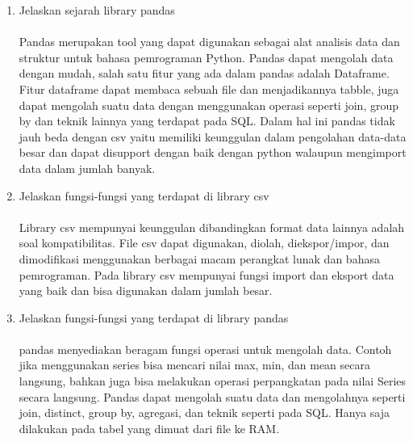 \begin{enumerate}
\item Jelaskan sejarah library pandas
\paragraph{} Pandas merupakan tool yang dapat digunakan sebagai alat analisis data dan struktur untuk bahasa pemrograman Python. Pandas dapat mengolah data dengan mudah, salah satu fitur yang ada dalam pandas adalah Dataframe. Fitur dataframe dapat membaca sebuah file dan menjadikannya tabble, juga dapat mengolah suatu data dengan menggunakan operasi seperti join, group by dan teknik lainnya yang terdapat pada SQL. Dalam hal ini pandas tidak jauh beda dengan csv yaitu memiliki keunggulan dalam pengolahan data-data besar dan dapat disupport dengan baik dengan python walaupun mengimport data dalam jumlah banyak.

\item Jelaskan fungsi-fungsi yang terdapat di library csv
\paragraph{} Library csv mempunyai keunggulan dibandingkan format data lainnya adalah soal kompatibilitas. File csv dapat digunakan, diolah, diekspor/impor, dan dimodifikasi menggunakan berbagai macam perangkat lunak dan bahasa pemrograman. Pada library csv mempunyai fungsi import dan eksport data yang baik dan bisa digunakan dalam jumlah besar.

\item Jelaskan fungsi-fungsi yang terdapat di library pandas
\paragraph{} pandas menyediakan beragam fungsi operasi untuk mengolah data. Contoh jika menggunakan series bisa mencari nilai max, min, dan mean secara langsung, bahkan juga bisa melakukan operasi perpangkatan pada nilai Series secara langsung.
Pandas dapat mengolah suatu data dan mengolahnya seperti join, distinct, group by, agregasi, dan teknik seperti pada SQL. Hanya saja dilakukan pada tabel yang dimuat dari file ke RAM.
\end{enumerate}



